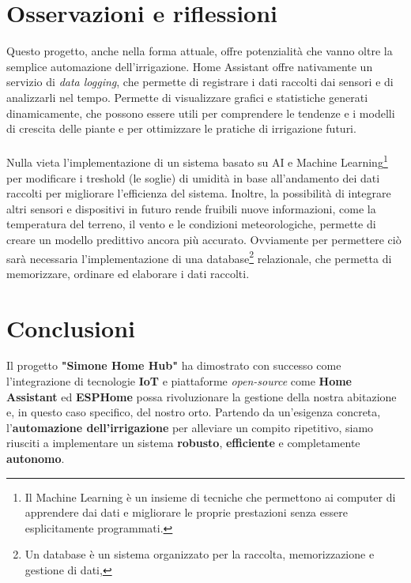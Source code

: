 \documentclass[11pt, a4paper]{article}
\begin{document}
\section{Osservazioni e riflessioni}

Questo progetto, anche nella forma attuale, offre potenzialità che vanno oltre la semplice automazione dell'irrigazione.
Home Assistant offre nativamente un servizio di \textit{data logging}, che permette di registrare i dati raccolti dai 
sensori e di analizzarli nel tempo. Permette di visualizzare grafici e statistiche generati dinamicamente,
che possono essere utili per comprendere le tendenze e i modelli di crescita delle piante e per ottimizzare
le pratiche di irrigazione futuri.\\
\\
Nulla vieta l'implementazione di un sistema basato su AI e
Machine Learning\footnote{Il Machine Learning è un insieme di 
tecniche che permettono ai computer di apprendere dai dati e migliorare le proprie prestazioni senza 
essere esplicitamente programmati.} per modificare
i treshold (le soglie) di umidità in base all'andamento dei dati raccolti per migliorare l'efficienza del sistema.
Inoltre, la possibilità di integrare altri sensori e dispositivi in futuro rende fruibili nuove informazioni,
come la temperatura del terreno, il vento e le condizioni meteorologiche, permette di creare un modello predittivo
ancora più accurato. Ovviamente per permettere ciò sarà necessaria l'implementazione di una 
database\footnote{Un database è un sistema organizzato per la raccolta,
memorizzazione e gestione di dati,} relazionale,
che permetta di memorizzare, ordinare ed elaborare i dati raccolti.

\section{Conclusioni}

Il progetto \textbf{"Simone Home Hub"} ha dimostrato con successo come 
l'integrazione di tecnologie \textbf{IoT} e piattaforme \textit{open-source} come \textbf{Home Assistant} 
ed \textbf{ESPHome} possa rivoluzionare la gestione della nostra abitazione e, in questo 
caso specifico, del nostro orto. Partendo da un'esigenza concreta, l'\textbf{automazione 
dell'irrigazione} per alleviare un compito ripetitivo, siamo riusciti a 
implementare un sistema \textbf{robusto}, \textbf{efficiente} e completamente \textbf{autonomo}.
\end{document}
